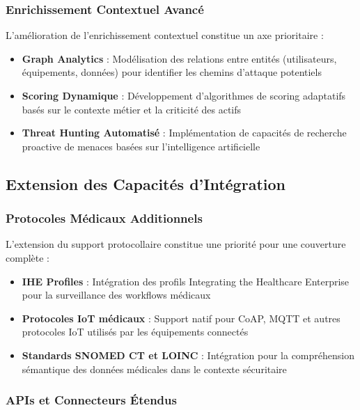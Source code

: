\subsubsection{Enrichissement Contextuel Avancé}

L'amélioration de l'enrichissement contextuel constitue un axe prioritaire :

\begin{itemize}
    \item \textbf{Graph Analytics} : Modélisation des relations entre entités (utilisateurs, équipements, données) pour identifier les chemins d'attaque potentiels
    \item \textbf{Scoring Dynamique} : Développement d'algorithmes de scoring adaptatifs basés sur le contexte métier et la criticité des actifs
    \item \textbf{Threat Hunting Automatisé} : Implémentation de capacités de recherche proactive de menaces basées sur l'intelligence artificielle
\end{itemize}

\subsection{Extension des Capacités d'Intégration}

\subsubsection{Protocoles Médicaux Additionnels}

L'extension du support protocollaire constitue une priorité pour une couverture complète :

\begin{itemize}
    \item \textbf{IHE Profiles} : Intégration des profils Integrating the Healthcare Enterprise pour la surveillance des workflows médicaux
    \item \textbf{Protocoles IoT médicaux} : Support natif pour CoAP, MQTT et autres protocoles IoT utilisés par les équipements connectés
    \item \textbf{Standards SNOMED CT et LOINC} : Intégration pour la compréhension sémantique des données médicales dans le contexte sécuritaire
\end{itemize}

\subsubsection{APIs et Connecteurs Étendus}

